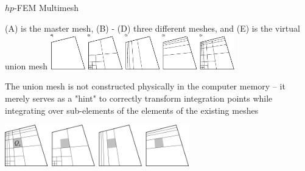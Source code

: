 \begin{frame}{$hp$-FEM}
  {Multimesh}

   \tiny
   (A) is the master mesh, (B) - (D) three different meshes, and (E) is the virtual union mesh
    \includegraphics[width=8cm]{figures/multimesh}

    \vspace{.3cm}

    The union mesh is not constructed physically in the computer memory -- it merely serves as a "hint" to correctly transform integration points while integrating over sub-elements of the elements of the existing meshes

    \includegraphics[width=8cm]{figures/multimesh2}





\end{frame}

